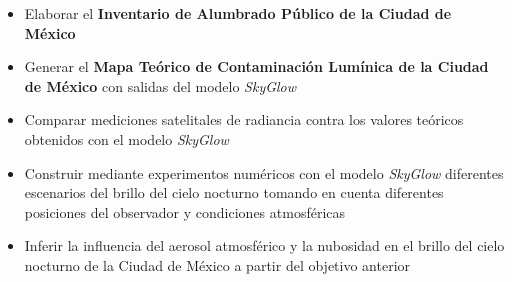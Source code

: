 \begin{itemize}

    \item Elaborar el \textbf{Inventario de Alumbrado Público de la Ciudad de México}
    
    \item Generar el \textbf{Mapa Teórico de Contaminación Lumínica de la Ciudad de México} con salidas del modelo \textit{SkyGlow} 
    
    \item Comparar mediciones satelitales de radiancia contra los valores teóricos obtenidos con el modelo \textit{SkyGlow}
    
    \item Construir mediante experimentos numéricos con el modelo \textit{SkyGlow} diferentes escenarios del brillo del cielo nocturno tomando en cuenta diferentes posiciones del observador y condiciones atmosféricas
    
    \item Inferir la influencia del aerosol atmosférico  y la nubosidad en el brillo del cielo nocturno de la Ciudad de México a partir del objetivo anterior
    
    
\end{itemize}